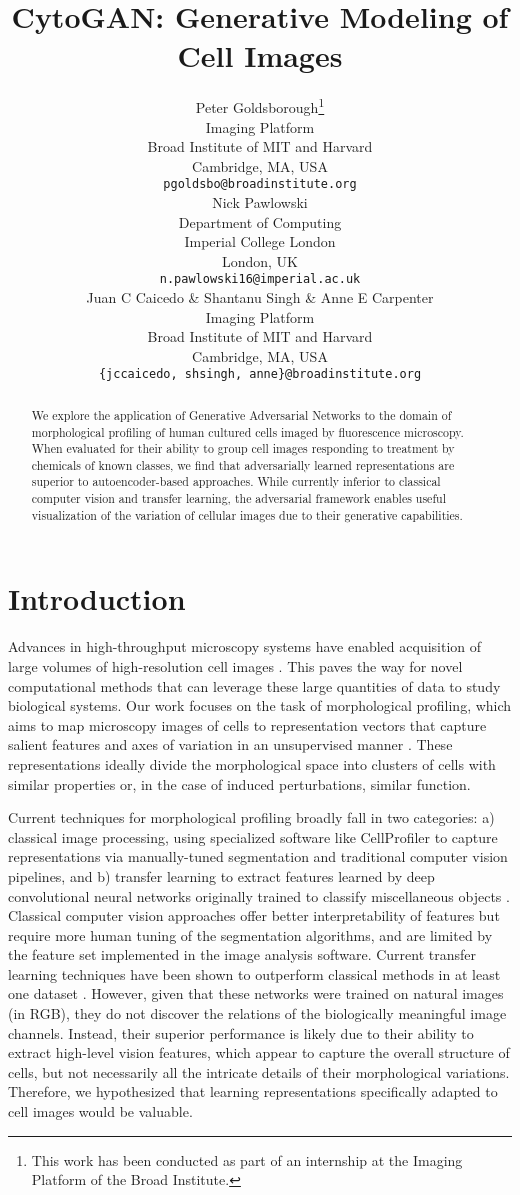 \documentclass{article}
\title{CytoGAN: Generative Modeling of Cell Images}
\author{
  Peter Goldsborough\thanks{This work has been conducted as part of an internship at the Imaging Platform of the Broad Institute.}\\
  Imaging Platform \\
  Broad Institute of MIT and Harvard \\
  Cambridge, MA, USA \\
  \texttt{pgoldsbo@broadinstitute.org} \\
  \And
  Nick Pawlowski \\
  Department of Computing \\
  Imperial College London \\
  London, UK \\
  \texttt{n.pawlowski16@imperial.ac.uk} \\
  \AND
  Juan C Caicedo \& Shantanu Singh \& Anne E Carpenter\\
  Imaging Platform \\
  Broad Institute of MIT and Harvard \\
  Cambridge, MA, USA \\
  \texttt{\{jccaicedo, shsingh, anne\}@broadinstitute.org} \\
}
\begin{document}
\maketitle

\begin{abstract}
We explore the application of Generative Adversarial Networks to the domain of morphological profiling of human cultured cells imaged by fluorescence microscopy. When evaluated for their ability to group cell images responding to treatment by chemicals of known classes, we find that adversarially learned representations are superior to autoencoder-based approaches. While currently inferior to classical computer vision and transfer learning, the adversarial framework enables useful visualization of the variation of cellular images due to their generative capabilities.
\end{abstract}

\section{Introduction}
Advances in high-throughput microscopy systems have enabled acquisition of large volumes of high-resolution cell images \cite{caicedo2017data}. This paves the way for novel computational methods that can leverage these large quantities of data to study biological systems. Our work focuses on the task of morphological profiling, which aims to map microscopy images of cells to representation vectors that capture salient features and axes of variation in an unsupervised manner \cite{caicedo_profiling}. These representations ideally divide the morphological space into clusters of cells with similar properties or, in the case of induced perturbations, similar function.

Current techniques for morphological profiling broadly fall in two categories: a) classical image processing, using specialized software like CellProfiler \cite{Carpenter2006} to capture representations via manually-tuned segmentation and traditional computer vision pipelines, and b) transfer learning to extract features learned by deep convolutional neural networks originally trained to classify miscellaneous objects \cite{pawlowski2016automating, ando2017improving}. Classical computer vision approaches offer better interpretability of features but require more human tuning of the segmentation algorithms, and are limited by the feature set implemented in the image analysis software. Current transfer learning techniques have been shown to outperform classical methods in at least one dataset \cite{pawlowski2016automating,ando2017improving}. However, given that these networks were trained on natural images (in RGB), they do not discover the relations of the biologically meaningful image channels. Instead, their superior performance is likely due to their ability to extract high-level vision features, which appear to capture the overall structure of cells, but not necessarily all the intricate details of their morphological variations. Therefore, we hypothesized that learning representations specifically adapted to cell images would be valuable.
\end{document}
